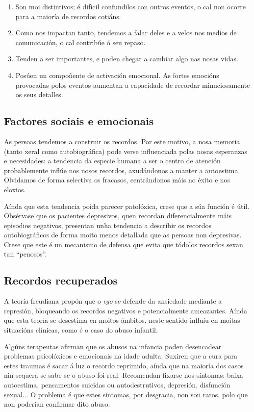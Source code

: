 \documentclass[a4paper,11pt]{article}
\begin{document}
\begin{enumerate}
	\item Son moi distintivos; é difícil confundilos con outros eventos, o cal non ocorre para a 			maioría de recordos cotiáns.
	\item Como nos impactan tanto, tendemos a falar deles e a velos nos medios de comunicación, o 
	cal contribúe ó seu repaso.
	\item Tenden a ser importantes, e poden chegar a cambiar algo nas nosas vidas.
	\item Posúen un compoñente de activación emocional. As fortes emocións provocadas polos eventos 
	aumentan a capacidade de recordar minuciosamente os seus detalles.
\end{enumerate}

\subsection{Factores sociais e emocionais}
As persoas tendemos a construir os recordos. Por este motivo, a nosa memoria (tanto xeral como autobiográfica) pode verse influenciada polas nosas esperanzas e necesidades: a tendencia da especie humana a ser o centro de atención probablemente inflúe nos nosos recordos, axudándonos a manter a autoestima. Olvidamos de forma selectiva os fracasos, centrándonos máis no éxito e nos eloxios. 

Aínda que esta tendencia poida parecer patolóxica, crese que a súa función é útil. Obsérvase que os pacientes depresivos, quen recordan diferencialmente máis episodios negativos, presentan unha tendencia a describir os recordos autobiográficos de forma moito menos detallada que as persoas non depresivas. Crese que este é un mecanismo de defensa que evita que tódolos recordos sexan tan ``penosos''.

\subsection{Recordos recuperados}
A teoría freudiana propón que o \textit{ego} se defende da ansiedade mediante a represión, bloqueando os recordos negativos e potencialmente ameazantes. Aínda que esta teoría se desestima en moitos ámbitos, neste sentido influíu en moitas situacións clínicas, como é o caso do abuso infantil.

Algúns terapeutas afirman que os abusos na infancia poden desencadear problemas psicolóxicos e emocionais na idade adulta. Suxiren que a cura para estes traumas é sacar á luz o recordo reprimido, aínda que na maioría dos casos nin sequera se sabe se o abuso foi real. Recomendan fixarse nos síntomas: baixa autoestima, pensamentos suicidas ou autodestrutivos, depresión, disfunción sexual... O problema é que estes síntomas, por desgracia, non son raros, polo que non poderían confirmar dito abuso.
\end{document}
